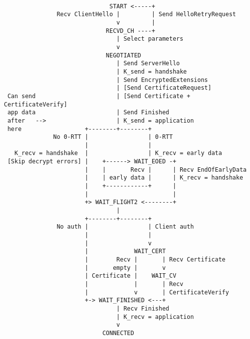 \begin{lstlisting}[language={},numbers=none,xleftmargin=2em,framexleftmargin=1.5em]

                              START <-----+
               Recv ClientHello |         | Send HelloRetryRequest
                                v         |
                             RECVD_CH ----+
                                | Select parameters
                                v
                             NEGOTIATED
                                | Send ServerHello
                                | K_send = handshake
                                | Send EncryptedExtensions
                                | [Send CertificateRequest]
 Can send                       | [Send Certificate + CertificateVerify]
 app data                       | Send Finished
 after   -->                    | K_send = application
 here                  +--------+--------+
              No 0-RTT |                 | 0-RTT
                       |                 |
   K_recv = handshake  |                 | K_recv = early data
 [Skip decrypt errors] |    +------> WAIT_EOED -+
                       |    |       Recv |      | Recv EndOfEarlyData
                       |    | early data |      | K_recv = handshake
                       |    +------------+      |
                       |                        |
                       +> WAIT_FLIGHT2 <--------+
                                |
                       +--------+--------+
               No auth |                 | Client auth
                       |                 |
                       |                 v
                       |             WAIT_CERT
                       |        Recv |       | Recv Certificate
                       |       empty |       v
                       | Certificate |    WAIT_CV
                       |             |       | Recv
                       |             v       | CertificateVerify
                       +-> WAIT_FINISHED <---+
                                | Recv Finished
                                | K_recv = application
                                v
                            CONNECTED
\end{lstlisting}

\newpage